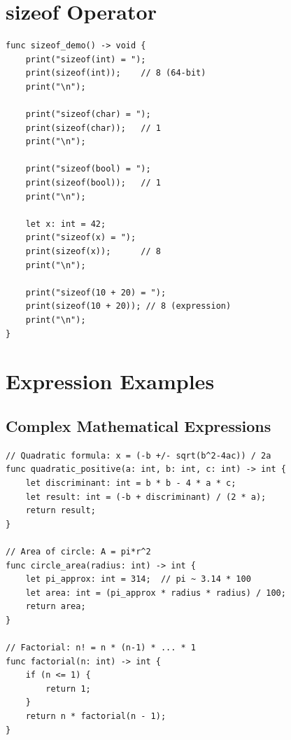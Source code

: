 \documentclass[12pt,a4paper,oneside]{book}
\begin{document}
\section{sizeof Operator}

\begin{lstlisting}[style=algo, caption={sizeof - Compile-Time Operator}]
func sizeof_demo() -> void {
    print("sizeof(int) = ");
    print(sizeof(int));    // 8 (64-bit)
    print("\n");
    
    print("sizeof(char) = ");
    print(sizeof(char));   // 1
    print("\n");
    
    print("sizeof(bool) = ");
    print(sizeof(bool));   // 1
    print("\n");
    
    let x: int = 42;
    print("sizeof(x) = ");
    print(sizeof(x));      // 8
    print("\n");
    
    print("sizeof(10 + 20) = ");
    print(sizeof(10 + 20)); // 8 (expression)
    print("\n");
}
\end{lstlisting}

\section{Expression Examples}

\subsection{Complex Mathematical Expressions}

\begin{lstlisting}[style=algo, caption={Mathematical Formulas}]
// Quadratic formula: x = (-b +/- sqrt(b^2-4ac)) / 2a
func quadratic_positive(a: int, b: int, c: int) -> int {
    let discriminant: int = b * b - 4 * a * c;
    let result: int = (-b + discriminant) / (2 * a);
    return result;
}

// Area of circle: A = pi*r^2
func circle_area(radius: int) -> int {
    let pi_approx: int = 314;  // pi ~ 3.14 * 100
    let area: int = (pi_approx * radius * radius) / 100;
    return area;
}

// Factorial: n! = n * (n-1) * ... * 1
func factorial(n: int) -> int {
    if (n <= 1) {
        return 1;
    }
    return n * factorial(n - 1);
}
\end{lstlisting}

\end{document}
